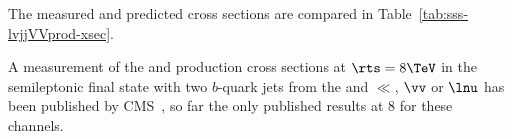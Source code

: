 The measured and predicted cross sections are compared in Table~\ref{tab:sss-lvjjVVprod-xsec}. 
\begin{table}[htdp]
\begin{center}
\caption{Summary of measured total $\WZ+\WW$ production cross sections from ATLAS and CMS
at 7 TeV centre-of-mass energies in the \WVlvqq\; final state.}
\end{center}
\label{tab:sss-lvjjVVprod-xsec}
\end{table}%

A  measurement of the \WZ\; and \ZZ\; production cross sections 
at $\rts=8\TeV$ in the semileptonic final state with two $b$-quark jets from the \Zzero 
and $\ll$, $\vv$ or $\lnu$ has been published by CMS~\cite{Chatrchyan:2014aqa}, so 
far the only published results at 8 \TeV\; for these channels.


% 







